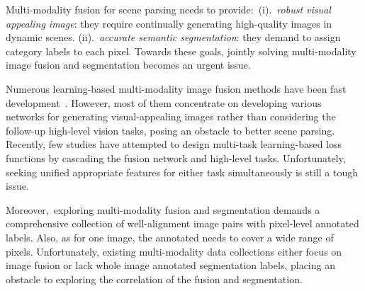 \documentclass[10pt,twocolumn,letterpaper]{article}
\begin{document}
Multi-modality fusion for scene parsing needs to provide:~(i).~\emph{robust visual appealing image}: they require continually generating high-quality images in dynamic scenes. (ii).~\emph{accurate semantic segmentation}: they demand to assign category labels to each pixel.  Towards these goals, jointly solving multi-modality image fusion and segmentation becomes an urgent issue.

Numerous learning-based multi-modality image fusion methods have been fast development~\cite{MFEIF2021,U2Fusion2020,zhao2020didfuse,reconet,UMFusion}. However, most of them concentrate on developing various networks for generating visual-appealing images rather than considering the follow-up high-level vision tasks, posing an obstacle to better scene parsing. Recently, few studies\cite{TarDAL,SeaFusion,ma2022toward,liu2021learning,liu2022twin} have attempted to design multi-task learning-based loss functions by cascading the fusion network and high-level tasks. Unfortunately, seeking unified appropriate features for either task simultaneously is still a tough issue. 



Moreover,~exploring multi-modality fusion and segmentation demands a comprehensive collection of well-alignment image pairs with pixel-level annotated labels. Also, as for one image, the annotated needs to cover a wide range of pixels. Unfortunately, existing multi-modality data collections either focus on image fusion or lack whole image annotated segmentation labels, placing an obstacle to exploring the correlation of the fusion and segmentation.  
\end{document}
